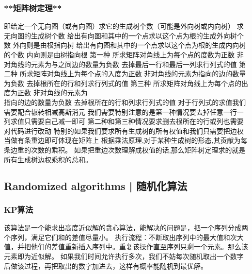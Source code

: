 \documentclass[8pt,a4paper]{article}
\newcommand{\code}[1]{
    
}
\newcommand{\txt}[1]{\par\noindent\footnotesize #1}
\newcommand{\inlineformula}[1]{\ensuremath{}}
\newcommand{\displayformula}[1]{%
    \vspace{0.2em}
    \[
        
    \]
}
\begin{document}
\begin{multicols}{2}
        \subsubsection{**矩阵树定理**}
            \txt{即给定一个无向图（或有向图）求它的生成树个数（可能是外向树或内向树）
\inlineformula{./assets/formulas_tex/formula_371.tex}求无向图的生成树个数
\inlineformula{./assets/formulas_tex/formula_372.tex}给出有向图和其中的一个点求以这个点为根的生成外向树个数  外向则是由根指向树
\inlineformula{./assets/formulas_tex/formula_373.tex}给出有向图和其中的一个点求以这个点为根的生成内向树的个数 内向则是由树指向根
第一种
所求矩阵\inlineformula{./assets/formulas_tex/formula_374.tex}对角线上为每个点的度数为正数
非对角线的元素\inlineformula{./assets/formulas_tex/formula_375.tex}为\inlineformula{./assets/formulas_tex/formula_376.tex}与\inlineformula{./assets/formulas_tex/formula_377.tex}之间边的数量为负数
去掉最后一行和最后一列求行列式的值
第二种
所求矩阵\inlineformula{./assets/formulas_tex/formula_378.tex}对角线上为每个点的入度为正数
非对角线的元素\inlineformula{./assets/formulas_tex/formula_379.tex}为\inlineformula{./assets/formulas_tex/formula_380.tex}指向\inlineformula{./assets/formulas_tex/formula_381.tex}的边的数量为负数
去掉根所在的行和列求行列式的值
第三种
所求矩阵\inlineformula{./assets/formulas_tex/formula_382.tex}对角线上为每个点的出度为正数
非对角线的元素\inlineformula{./assets/formulas_tex/formula_383.tex}为\displayformula{./assets/formulas_tex/formula_384.tex}指向\inlineformula{./assets/formulas_tex/formula_385.tex}的边的数量为负数
去掉根所在的行和列求行列式的值
对于行列式的求值我们需要配合辗转相减高斯消元
我们需要特别注意的是第一种情况要去掉任意一行一列求值只需要\inlineformula{./assets/formulas_tex/formula_386.tex}自己减一即可
第二种和第三种情况要求删去根所在的行或列也需要对代码进行改动
特别的如果我们要求所有生成树的所有权值和我们只需要把边权\inlineformula{./assets/formulas_tex/formula_387.tex}当做有\inlineformula{./assets/formulas_tex/formula_388.tex}条重边即可体现在矩阵上
根据乘法原理,对于某种生成树的形态,其贡献为每条边重的次数的乘积。
如果把重边次数理解成权值的话,那么矩阵树定理求的就是所有生成树边权乘积的总和。}
            \code{src/number_theory/树计数_2_5.cpp}

    \subsection{Randomized algorithms | 随机化算法}
        \subsubsection{KP算法}
            \txt{该算法是一个能求出高度近似解的贪心算法，能解决的问题是，把一个序列分成两个序列，满足它们和的差值尽量小。
执行流程：不断取出序列中的最大值和次大值，并把他们的差值重新插入序列中。重复该操作直至序列只剩一个元素。那么该元素即为近似解。
如果我们时间允许执行多次，我们不妨每次随机取出一个数字后做该过程，再把取出的数字加进去，这样有概率能随机到最优解。}

\end{multicols}
\end{document}

